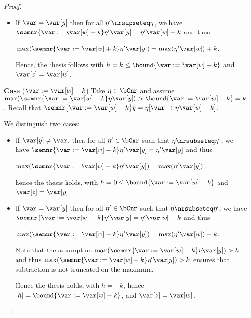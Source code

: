 \begin{proof}
\begin{itemize}
  \item 
    If \(\var = \var[y]\) then  for all \(\eta' \nrsupseteq \eta\), we have
    \(\semnr{\var := \var[w] + k}\eta' \var[y] = \eta' \var[w] +
    k\) and thus
    \begin{center}
      \(\max(\semnr{\var := \var[w] + k}\eta' \var[y]) = \max(\eta' \var[w]) +
      k\).
    \end{center}
    
    Hence, the thesis follows with \(h = k \leq \bound{\var := \var[w] + k}\)
    and \(\var[z] = \var[w]\).
  \end{itemize}
  

  
  \medskip
  
  \noindent
  \textbf{Case} (\(\var := \var[w] - k\))
  Take \(\eta \in \bCnr\) and assume
  \(\max(\semnr{\var := \var[w] - k}\eta \var[y]) > \bound{\var := \var[w] - k} = k\).
  Recall that
  \(\semnr{\var := \var[w] - k}\eta = \eta[\var \mapsto \eta \var[w] - k]\).
  
  We distinguish two cases:
  \begin{itemize}
    
  \item If \(\var[y] \neq \var\), then for all
    \(\eta' \in \bCnr\) such that
    \(\eta \nrsubseteq \eta'\), we have
    \(\semnr{\var := \var[w] - k}\eta' \var[y] = \eta' \var[y]\) and thus
    \begin{center}
      \(\max(\semnr{\var := \var[w] - k}\eta' \var[y]) = \max(\eta' \var[y])\).
    \end{center}
    hence the thesis holds, with
    \(h =0 \leq \bound{\var := \var[w] - k}\) and \(\var[z] = \var[y]\).
    
  \item If \(\var = \var[y]\) then for all \(\eta' \in \bCnr\) such
    that \(\eta \nrsubseteq \eta'\), we have
    \(\semnr{\var := \var[w] - k}\eta' \var[y] = \eta' \var[w] - k\) and
    thus
    \begin{center}
      \(\max(\semnr{\var := \var[w] - k}\eta' \var[y]) = \max(\eta' \var[w]) -
      k\).
    \end{center}
    Note that the assumption \(\max(\semnr{\var := \var[w] - k}\eta \var[y]) > k\) and thus
    \(\max(\semnr{\var := \var[w] - k}\eta' \var[y]) > k\) ensures that subtraction is not
    truncated on the maximum.
    
    Hence the thesis holds, with \(h = -k\), hence \(|h| = \bound{\var := \var[w] - k}\),
    and \(\var[z] = \var[w]\).
  \end{itemize}
  

\end{proof}
